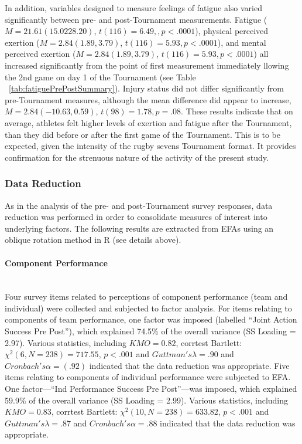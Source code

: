 \documentclass[12pt]{report}
\newcommand{\myparagraph}[1]{\paragraph{#1}\mbox{}\\}
\begin{document}
{In addition, variables designed to measure feelings of fatigue also varied significantly between pre- and post-Tournament measurements.  Fatigue ($M = 21.61 (15.02 28.20)$, $t(116)= 6.49,, p < .0001$), physical perceived exertion ($M = 2.84 (1.89, 3.79)$, $t(116)= 5.93, p < .0001$), and mental perceived exertion ($M = 2.84 (1.89, 3.79)$, $t(116)= 5.93, p < .0001$) all increased significantly from the point of first measurement immediately llowing the 2nd game on day 1 of the Tournament (see Table ~\ref{tab:fatiguePrePostSummary}).  Injury status did not differ significantly from pre-Tournament measures, although the mean difference did appear to increase, $M = 2.84 (-10.63, 0.59)$, $t(98)= 1.78, p = .08$.  These results indicate that on average, athletes felt higher levels of exertion and fatigue after the Tournament, than they did before or after the first game of the Tournament. This is to be expected, given the intensity of the rugby sevens Tournament format. It provides confirmation for the strenuous nature of the activity of the present study.


\begin{landscape}






\end{landscape}
\restoregeometry



\subsubsection{Data Reduction}
As in the analysis of the pre- and post-Tournament survey responses, data reduction was performed in order to consolidate measures of interest into underlying factors. The following results are extracted from EFAs using an oblique rotation method in R (see details above).

\myparagraph{Component Performance}
Four survey items related to perceptions of component performance (team and individual) were collected and subjected to factor analysis. For items relating to components of team performance, one factor was imposed (labelled ``Joint Action Success Pre Post''),  which explained 74.5\% of the overall variance (SS Loading = 2.97).  Various statistics, including $KMO = 0.82$, corrtest Bartlett: $\chi^2(6, N = 238) = 717.55$, $p < .001$ and $Guttman's \lambda =.90$ and $Cronbach's \alpha = (.92)$ indicated that the data reduction was appropriate. Five items relating to components of individual performance were subjected to EFA. One factor—``Ind Performance Success Pre Post''—was imposed, which explained 59.9\% of the overall variance (SS Loading = 2.99).  Various statistics, including $KMO = 0.83$, corrtest Bartlett: $\chi^2(10, N = 238) = 633.82$, $p < .001$ and $Guttman's\lambda =.87$ and $Cronbach's \alpha = .88$ indicated that the data reduction was appropriate.

}
\end{document}
